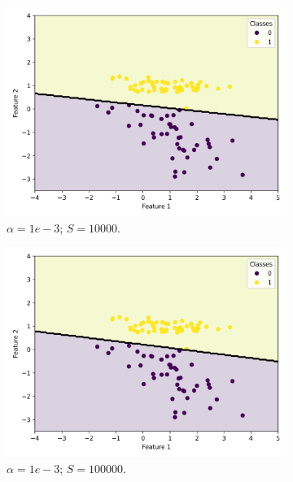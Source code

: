 \documentclass{article}
\begin{document}
\begin{figure}
\begin{subfigure}[t]{0.24\textwidth}
    \includegraphics[width=\linewidth]{scatter_predictions_with_contour_3_learning_rate_10000_sample_10000.png}
    \caption{$\alpha = 1e-3$; $S = 10000$.}
  \end{subfigure}
  \hfill
  \begin{subfigure}[t]{0.24\textwidth}
    \centering
    \includegraphics[width=\linewidth]{scatter_predictions_with_contour_3_learning_rate_10000_sample_100000.png}
    \caption{$\alpha = 1e-3$; $S = 100000$.}
  \end{subfigure}
  \begin{subfigure}[t]{0.24\textwidth}
    \centering

\end{subfigure}
\end{figure}
\end{document}

